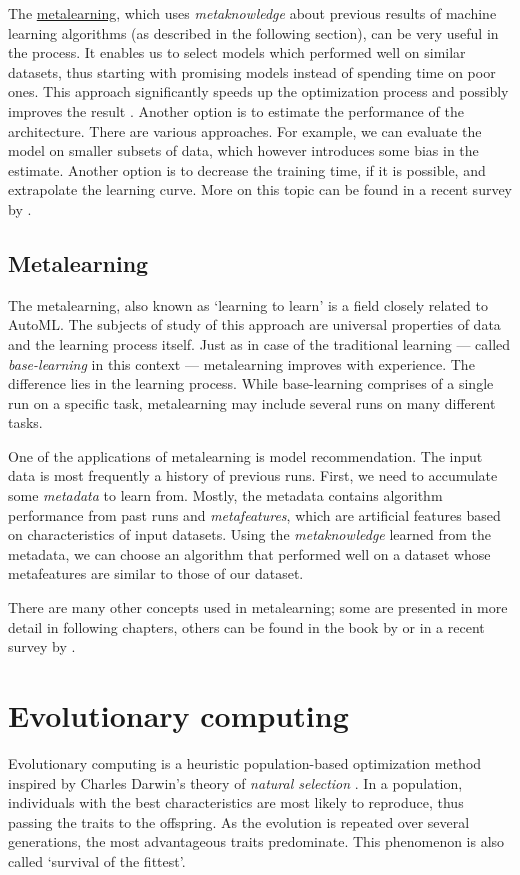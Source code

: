 The \hyperref[metalearning]{metalearning}, which uses \emph{metaknowledge}
about previous results of machine learning algorithms (as described in the
following section), can be very useful in the process. It enables us to
select models which performed well on similar datasets, thus starting with
promising models instead of spending time on poor ones. This approach
significantly speeds up the optimization process and possibly improves the
result \citep{DBLP:journals/corr/abs-1810-03548}.
Another option is to estimate the performance of the architecture. There are
various approaches. For example, we can evaluate the model on smaller subsets of
data, which however introduces some bias in the estimate. Another option is to
decrease the training time, if it is possible, and extrapolate the learning
curve. More on this topic can be found in a recent survey by
\cite{2018arXiv180805377E}.

\subsection{Metalearning} \label{metalearning}
The metalearning, also known as `learning to learn' is a field closely related
to AutoML. The subjects of study of this approach are universal properties of 
data and the learning process itself. Just as in case of the traditional
learning --- called \emph{base-learning} in this context --- metalearning
improves with experience. The difference lies in the learning process. While
base-learning comprises of a single run on a specific task, metalearning may
include several runs on many different tasks. 

One of the applications of metalearning is model recommendation. The input
data is most frequently a history of previous runs. First, we need to
accumulate some \emph{metadata} to learn from. Mostly, the metadata contains
algorithm performance from past runs and \emph{metafeatures}, which are
artificial features based on characteristics of input datasets. Using the
\emph{metaknowledge} learned from the metadata, we can choose an algorithm that
performed well on a dataset whose metafeatures are similar to those of our
dataset.

There are many other concepts used in metalearning; some are presented in more
detail in following chapters, others can be found in the book by
\cite{Brazdil:2008:MAD:1507541} or in a recent survey by
\cite{DBLP:journals/corr/abs-1810-03548}.

\section{Evolutionary computing} \label{ea}
Evolutionary computing is a heuristic population-based optimization method
inspired by  Charles Darwin's theory of \emph{natural selection} \cite{darwin}.
In a population, individuals with the best characteristics are most likely
to reproduce, thus passing the traits to the offspring. As the 
evolution is repeated over several generations, the most advantageous traits 
predominate. This phenomenon is also called `survival of the fittest'.

